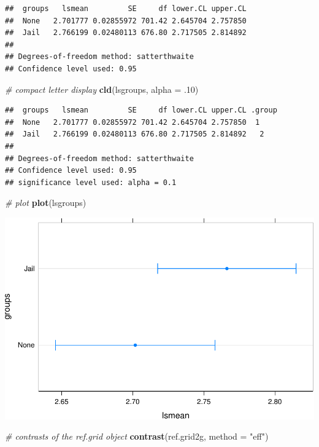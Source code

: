 \documentclass[]{article}
\newenvironment{Shaded}{\begin{snugshade}}{\end{snugshade}}
\newcommand{\KeywordTok}[1]{\textcolor[rgb]{0.13,0.29,0.53}{\textbf{#1}}}
\newcommand{\DataTypeTok}[1]{\textcolor[rgb]{0.13,0.29,0.53}{#1}}
\newcommand{\DecValTok}[1]{\textcolor[rgb]{0.00,0.00,0.81}{#1}}
\newcommand{\StringTok}[1]{\textcolor[rgb]{0.31,0.60,0.02}{#1}}
\newcommand{\CommentTok}[1]{\textcolor[rgb]{0.56,0.35,0.01}{\textit{#1}}}
\newcommand{\NormalTok}[1]{#1}
\begin{document}
\begin{verbatim}
##  groups   lsmean         SE     df lower.CL upper.CL
##  None   2.701777 0.02855972 701.42 2.645704 2.757850
##  Jail   2.766199 0.02480113 676.80 2.717505 2.814892
## 
## Degrees-of-freedom method: satterthwaite 
## Confidence level used: 0.95
\end{verbatim}

\begin{Shaded}
\begin{Highlighting}[]
\CommentTok{# compact letter display}
\KeywordTok{cld}\NormalTok{(lsgroups, }\DataTypeTok{alpha =}\NormalTok{ .}\DecValTok{10}\NormalTok{)}
\end{Highlighting}
\end{Shaded}

\begin{verbatim}
##  groups   lsmean         SE     df lower.CL upper.CL .group
##  None   2.701777 0.02855972 701.42 2.645704 2.757850  1    
##  Jail   2.766199 0.02480113 676.80 2.717505 2.814892   2   
## 
## Degrees-of-freedom method: satterthwaite 
## Confidence level used: 0.95 
## significance level used: alpha = 0.1
\end{verbatim}

\begin{Shaded}
\begin{Highlighting}[]
\CommentTok{# plot}
\KeywordTok{plot}\NormalTok{(lsgroups)}
\end{Highlighting}
\end{Shaded}

\includegraphics{Conditional_Models_doc_files/figure-latex/unnamed-chunk-42-1.pdf}

\begin{Shaded}
\begin{Highlighting}[]
\CommentTok{# contrasts of the ref.grid object}
\KeywordTok{contrast}\NormalTok{(ref.grid2g, }\DataTypeTok{method =} \StringTok{"eff"}\NormalTok{)}
\end{Highlighting}
\end{Shaded}
\end{document}
